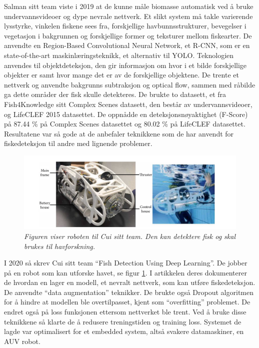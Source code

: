 
Salman sitt team viste i 2019 at de kunne måle biomasse automatisk ved å bruke undervannsvideoer og dype nevrale nettverk.  Et slikt system må takle varierende lysstyrke, vinkelen fiskene sees fra, forskjellige havbunnsstrukturer, bevegelser i vegetasjon i bakgrunnen og forskjellige former og teksturer mellom fiskearter. De anvendte en Region-Based Convolutional Neural Network, et R-CNN, som er en state-of-the-art maskinlæringsteknikk, et alternativ til YOLO. Teknologien anvendes til objektdeteksjon, den gir informasjon om hvor i et bilde forskjellige objekter er samt hvor mange det er av de forskjellige objektene. De trente et nettverk og anvendte bakgrunns subtraksjon og optical flow, sammen med råbilde ga dette områder der fisk skulle detekteres. De brukte to datasett, et fra Fish4Knowledge sitt Complex Scenes datasett, den består av undervannsvideoer, og LifeCLEF 2015 datasettet. De oppnådde en deteksjonsnøyaktighet (F-Score) på 87.44 \% på Complex Scenes datasettet og 80.02 \% på LifeCLEF datasettet. Resultatene var så gode at de anbefaler teknikkene som de har anvendt for fiskedeteksjon til andre med lignende problemer. \cite{Salman m.fl. 2019}

\begin{figure}
\begin{center} 
\includegraphics[scale=0.45]{figures/auv}
\caption{\small \sl Figuren viser roboten til Cui sitt team. Den kan detektere fisk og skal brukes til havforskning. \cite{Cui m.fl. 2020} \label{fig:auv}} 
\end{center} 
\end{figure} 

I 2020 så skrev Cui sitt team ``Fish Detection Using Deep Learning''. De jobber på en robot som kan utforske havet, se figur \ref{fig:auv}. I artikkelen deres dokumenterer de hvordan en lager en modell, et nevralt nettverk, som kan utføre fiskedeteksjon. De anvendte ``data augmentation'' teknikker. De brukte også Dropout algoritmen for å hindre at modellen ble overtilpasset, kjent som ``overfitting'' problemet. De endret også på loss funksjonen ettersom nettverket ble trent. Ved å bruke disse teknikkene så klarte de å redusere treningstiden og training loss. Systemet de lagde var optimalisert for et embedded system, altså svakere datamaskiner, en AUV robot. \cite{Cui m.fl. 2020}


